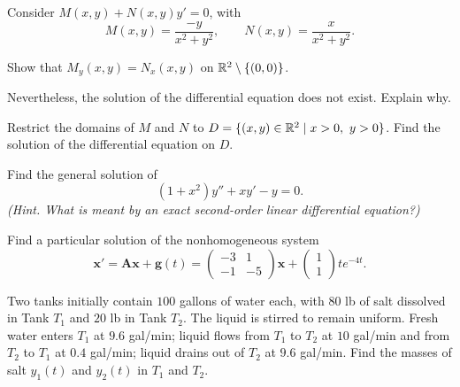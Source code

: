 \documentclass[11pt,oneside]{article}
\begin{document}
\begin{problem}
Consider $M(x,y)+N(x,y)y'=0$, with
\[
M(x,y)=\frac{-y}{x^2+y^2},\qquad N(x,y)=\frac{x}{x^2+y^2}.
\]
\begin{problemsubparts}
\item Show that $M_y(x,y)=N_x(x,y)$ on $\mathbb{R}^2\setminus\{(0,0)\}$.
\item Nevertheless, the solution of the differential equation does not exist. Explain why.
\item Restrict the domains of $M$ and $N$ to $D=\{(x,y)\in\R^2\mid x>0,\ y>0\}$. Find the solution of the differential equation on $D$.
\end{problemsubparts}
\end{problem}

\begin{problem}
Find the general solution of
\[
(1+x^2)y''+xy'-y=0.
\]
\textit{(Hint. What is meant by an exact second-order linear differential equation?)}
\end{problem}

\begin{problem}
Find a particular solution of the nonhomogeneous system
\[
\mathbf x'=\mathbf A\mathbf x+\mathbf g(t)
=\begin{pmatrix}-3&1\\-1&-5\end{pmatrix}\mathbf x+
\begin{pmatrix}1\\1\end{pmatrix}te^{-4t}.
\]
\end{problem}

\begin{problem}
Two tanks initially contain $100$ gallons of water each, with $80$ lb of salt dissolved in Tank $T_1$ and $20$ lb in Tank $T_2$. The liquid is stirred to remain uniform. Fresh water enters $T_1$ at $9.6$ gal/min; liquid flows from $T_1$ to $T_2$ at $10$ gal/min and from $T_2$ to $T_1$ at $0.4$ gal/min; liquid drains out of $T_2$ at $9.6$ gal/min. Find the masses of salt $y_1(t)$ and $y_2(t)$ in $T_1$ and $T_2$.
\end{problem}
\end{document}
